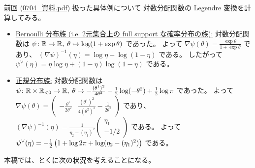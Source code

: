 \documentclass[report]{jlreq}
\begin{document}
\begin{example}
    前回 (\url{0704_資料.pdf}) 扱った具体例について
    対数分配関数の Legendre 変換を計算してみる。
    \begin{itemize}
        \item \uline{Bernoulli 分布族 (i.e. 2元集合上の full support な確率分布の族):} \quad
            対数分配関数は
            $\psi \colon \mathbb{R} \to \mathbb{R}, \; \theta \mapsto \log (1 + \exp \theta)$
            であった。
            よって
            $\nabla \psi(\theta)
                =
                    \frac{\exp \theta}{1 + \exp \theta}$
            であり、
            $(\nabla \psi)^{-1}(\eta)
                =
                    \log \eta - \log (1 - \eta)$
            である。
            したがって
            $\psi^\vee(\eta)
                =
                    \eta \log \eta
                    + (1 - \eta) \log (1 - \eta)$
            である。
        \item \uline{正規分布族:} \quad
            対数分配関数は
            $\psi \colon \mathbb{R} \times \mathbb{R}_{< 0} \to \mathbb{R}, \;
                \theta
                \mapsto
                - \frac{(\theta^1)^2}{4 \theta^2}
                - \frac{1}{2} \log (- \theta^2)
                + \frac{1}{2} \log \pi$
            であった。
            よって
            $\nabla \psi(\theta)
                =
                    \begin{pmatrix}
                        - \frac{\theta^1}{2 \theta^2}
                        &
                        \frac{(\theta^1)^2}{4 (\theta^2)^2} - \frac{1}{2 \theta^2}
                    \end{pmatrix}$
            であり、
            $(\nabla \psi)^{-1}(\eta)
                =
                    \frac{1}{\eta_2 - (\eta_1)^2}
                    \begin{pmatrix}
                        \eta_1
                        \\
                        - 1/2
                    \end{pmatrix}$
            である。
            よって
            $\psi^\vee(\eta)
                =
                    - \frac{1}{2}
                    \left({
                        1 + \log 2\pi
                        + \log(\eta_2 - (\eta_1)^2)
                    }\right)$
            である。
    \end{itemize}
\end{example}

本稿では、とくに次の状況を考えることになる。
\end{document}
